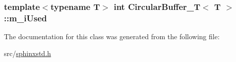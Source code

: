 \hypertarget{classCircularBuffer__T_a23ff90b0382161cdd8e9e9e530a38e1b}{
\subsubsection[{m\-\_\-i\-Used}]{\setlength{\rightskip}{0pt plus 5cm}template$<$typename T$>$ {\bf int} {\bf Circular\-Buffer\-\_\-\-T}$<$ T $>$\-::m\-\_\-i\-Used\hspace{0.3cm}{\ttfamily [private]}}}\label{classCircularBuffer__T_a23ff90b0382161cdd8e9e9e530a38e1b}


The documentation for this class was generated from the following file\-:\begin{DoxyCompactItemize}
\item 
src/\hyperlink{sphinxstd_8h}{sphinxstd.\-h}\end{DoxyCompactItemize}
